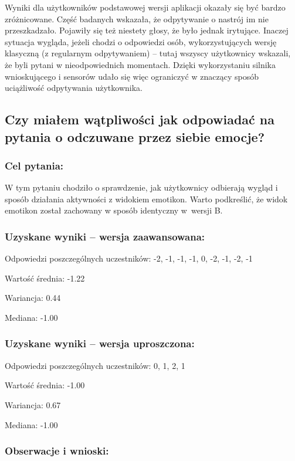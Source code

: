 	Wyniki dla użytkowników podstawowej wersji aplikacji okazały się być bardzo zróżnicowane. Część badanych wskazała, że odpytywanie o nastrój im nie przeszkadzało. Pojawiły się też niestety głosy, że było jednak irytujące. Inaczej sytuacja wygląda, jeżeli chodzi o odpowiedzi osób, wykorzystujących wersję klasyczną (z regularnym odpytywaniem) -- tutaj wszyscy użytkownicy wskazali, że byli pytani w nieodpowiednich momentach. Dzięki wykorzystaniu silnika wnioskującego i sensorów udało się więc ograniczyć w znaczący sposób uciążliwość odpytywania użytkownika.
	
	
	\subsection{Czy miałem wątpliwości jak odpowiadać na pytania o odczuwane przez siebie emocje?}
	
	\subsubsection{Cel pytania:}
	
	W tym pytaniu chodziło o sprawdzenie, jak użytkownicy odbierają wygląd i sposób działania aktywności z widokiem emotikon. Warto podkreślić, że widok emotikon został zachowany w sposób identyczny w~wersji B.
	
	\subsubsection{Uzyskane wyniki -- wersja zaawansowana:}
	
	Odpowiedzi poszczególnych uczestników: -2, -1, -1, -1, 0, -2, -1, -2, -1
	
	Wartość średnia: -1.22
	
	Wariancja: 0.44
	
	Mediana: -1.00
	
	\subsubsection{Uzyskane wyniki -- wersja uproszczona:}
	
	Odpowiedzi poszczególnych uczestników: 0, 1, 2, 1
	
	Wartość średnia: -1.00
	
	Wariancja: 0.67
	
	Mediana: -1.00
	
	\subsubsection{Obserwacje i wnioski:}
	

